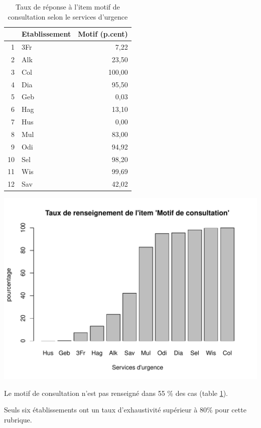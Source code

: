\documentclass[12pt,english,french,twoside]{book}\usepackage[]{graphicx}\usepackage[]{color}
\makeatletter
\def\maxwidth{ %
  \ifdim\Gin@nat@width>\linewidth
    \linewidth
  \else
    \Gin@nat@width
  \fi
}
\makeatother
\begin{document}
\begin{table}[ht]
\centering
\begin{tabular}{rlr}
  \hline
 & Etablissement & Motif (p.cent) \\ 
  \hline
1 & 3Fr & 7,22 \\ 
  2 & Alk & 23,50 \\ 
  3 & Col & 100,00 \\ 
  4 & Dia & 95,50 \\ 
  5 & Geb & 0,03 \\ 
  6 & Hag & 13,10 \\ 
  7 & Hus & 0,00 \\ 
  8 & Mul & 83,00 \\ 
  9 & Odi & 94,92 \\ 
  10 & Sel & 98,20 \\ 
  11 & Wis & 99,69 \\ 
  12 & Sav & 42,02 \\ 
   \hline
\end{tabular}
\caption[Motif de consultation]{Taux de réponse à l'item motif de consultation selon le services d'urgence} 
\label{lab:motif}
\end{table}

\includegraphics[width=\maxwidth]{figure/motifss-1} 


Le motif de consultation n'est pas renseigné dans 55 \% des cas (table \ref{lab:motif}).

Seuls six établissements ont un taux d'exhaustivité supérieur à 80\% pour cette rubrique.
\end{document}
